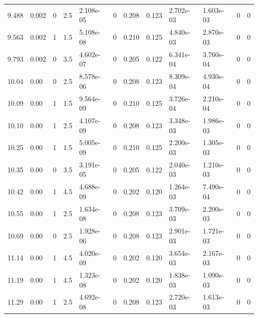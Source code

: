 \documentclass[preview]{standalone}
\begin{document}
{{{\begin{tabular}{L{1.2cm}C{1.2cm} C{0.3cm}C{0.5cm} C{1.4cm}C{1.4cm} C{1.4cm}C{1.4cm} C{1.6cm}C{1.6cm} C{1.6cm}C{1.6cm}}
  9.488  &  0.002  & 0     & 2.5 &  2.108e-05  & 0  &  0.208&   0.123& 2.702e-03 & 1.603e-03   &  0 & 0  \\ 
  9.563  &  0.002  & 1     & 1.5 &  5.108e-08  & 0  &  0.210&   0.125& 4.840e-03 & 2.870e-03   &  0 & 0  \\ 
  9.793  &  0.002  & 0     & 3.5 &  4.602e-07  & 0  &  0.205&   0.122& 6.341e-04 & 3.760e-04   &  0 & 0  \\ 
  10.04  &  0.00  & 0     & 2.5 &  8.578e-06  & 0  &  0.208&   0.123& 8.309e-04 & 4.930e-04   &  0 & 0  \\ 
  10.09  &  0.00  & 1     & 1.5 &  9.564e-09  & 0  &  0.210&   0.125& 3.726e-04 & 2.210e-04   &  0 & 0  \\ 
  10.10  &  0.00  & 1     & 2.5 &  4.107e-09  & 0  &  0.208&   0.123& 3.348e-03 & 1.986e-03   &  0 & 0  \\ 
  10.25  &  0.00  & 1     & 1.5 &  5.005e-09  & 0  &  0.210&   0.125& 2.200e-03 & 1.305e-03   &  0 & 0  \\ 
  10.35  &  0.00  & 0     & 3.5 &  3.191e-05  & 0  &  0.205&   0.122& 2.040e-03 & 1.210e-03   &  0 & 0  \\ 
  10.42  &  0.00  & 1     & 4.5 &  4.688e-09  & 0  &  0.202&   0.120& 1.264e-03 & 7.490e-04   &  0 & 0  \\ 
  10.55  &  0.00  & 1     & 2.5 &  1.634e-08  & 0  &  0.208&   0.123& 3.709e-03 & 2.200e-03   &  0 & 0  \\ 
  10.69  &  0.00  & 0     & 2.5 &  1.928e-06  & 0  &  0.208&   0.123& 2.901e-03 & 1.721e-03   &  0 & 0  \\ 
  11.14  &  0.00  & 1     & 4.5 &  4.020e-09  & 0  &  0.202&   0.120& 3.654e-03 & 2.167e-03   &  0 & 0  \\ 
  11.19  &  0.00  & 1     & 4.5 &  1.323e-08  & 0  &  0.202&   0.120& 1.838e-03 & 1.090e-03   &  0 & 0  \\ 
  11.29  &  0.00  & 1     & 2.5 &  4.692e-08  & 0  &  0.208&   0.123& 2.720e-03 & 1.613e-03   &  0 & 0  \\ 
\hline 
\end{tabular} 

}}}
\end{document}
